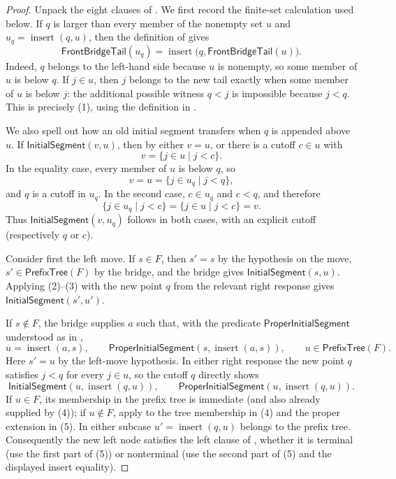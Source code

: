 \begin{proof}
Unpack the eight clauses of .  We first record the
finite-set calculation used below.  If $q$ is larger than every member of
the nonempty set $u$ and $u_q=\operatorname{insert}(q,u)$, then the
definition of  gives
\[
 \mathsf{FrontBridgeTail}(u_q)
 =\operatorname{insert}\bigl(q,\mathsf{FrontBridgeTail}(u)\bigr).
 \tag{1}
\]
Indeed, $q$ belongs to the left-hand side because $u$ is nonempty, so some
member of $u$ is below $q$.  If $j\in u$, then $j$ belongs to the new tail
exactly when some member of $u$ is below $j$: the additional possible
witness $q<j$ is impossible because $j<q$.  This is precisely (1), using
the definition in .

We also spell out how an old initial segment transfers when $q$ is appended
above $u$.  If $\mathsf{InitialSegment}(v,u)$, then by
 either $v=u$, or there is a cutoff $c\in u$ with
\[
 v=\{j\in u\mid j<c\}.
 \tag{2}
\]
In the equality case, every member of $u$ is below $q$, so
\[
 v=u=\{j\in u_q\mid j<q\},
\]
and $q$ is a cutoff in $u_q$.  In the second case, $c\in u_q$ and
$c<q$, and therefore
\[
 \{j\in u_q\mid j<c\}=\{j\in u\mid j<c\}=v.
 \tag{3}
\]
Thus $\mathsf{InitialSegment}(v,u_q)$ follows in both cases, with an
explicit cutoff (respectively $q$ or $c$).

Consider first the left move.  If $s\in F$, then $s'=s$ by the hypothesis
on the move, $s'\in\mathsf{PrefixTree}(F)$ by the bridge, and the bridge
gives $\mathsf{InitialSegment}(s,u)$.  Applying (2)--(3) with the new
point $q$ from the relevant right response gives
$\mathsf{InitialSegment}(s',u')$.

If $s\notin F$, the bridge supplies $a$ such that, with the predicate
$\mathsf{ProperInitialSegment}$ understood as in ,
\[
 u=\operatorname{insert}(a,s),\qquad
 \mathsf{ProperInitialSegment}(s,\operatorname{insert}(a,s)),\qquad
 u\in\mathsf{PrefixTree}(F).
 \tag{4}
\]
Here $s'=u$ by the left-move hypothesis.  In either right response the new
point $q$ satisfies $j<q$ for every $j\in u$, so the cutoff $q$ directly
shows
\[
 \mathsf{InitialSegment}(u,\operatorname{insert}(q,u)),
 \qquad
 \mathsf{ProperInitialSegment}(u,\operatorname{insert}(q,u)).
 \tag{5}
\]
If $u\in F$, its membership in the prefix tree is immediate (and also
already supplied by (4)); if $u\notin F$, apply
 to the tree membership in (4) and the
proper extension in (5).  In either subcase $u'=\operatorname{insert}(q,u)$
belongs to the prefix tree.  Consequently the new left node satisfies the
left clause of , whether it is terminal (use the first
part of (5)) or nonterminal (use the second part of (5) and the displayed
insert equality).


\end{proof}
